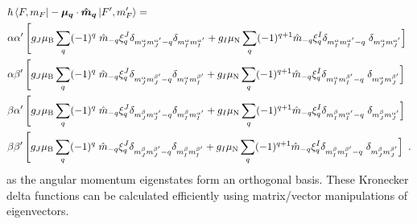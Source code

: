 \documentclass{article}
\begin{document}
\begin{equation}
\begin{split}
       &\hbar\left\langle F, m_F\right|-\boldsymbol{\mu_q}\cdot\boldsymbol{\hat{m}_q}\left|F', m_F'\right\rangle =   \\
       &\alpha \alpha' \left[g_J \mu_{\rm{B}}\sum_q  (-1)^q \right. \hat{m}_{-q} \xi^J_q \delta_{m_J^\alpha m_J^{\alpha'}-q} \delta_{m_I^\alpha m_I^{\alpha'}} + g_I \mu_{\rm{N}}\sum_q (-1)^{q+1}\hat{m}_{-q} \xi^I_q \delta_{m_I^\alpha m_I^{\alpha'}-q} \left. \delta_{m_J^\alpha m_J^{\alpha'}} \right] \\
        &\alpha \beta' \left[g_J \mu_{\rm{B}}\sum_q  (-1)^q \right. \hat{m}_{-q} \xi^J_q \delta_{m_J^\alpha m_J^{\beta'}-q} \delta_{m_I^\alpha m_I^{\beta'}} + g_I \mu_{\rm{N}}\sum_q (-1)^{q+1}\hat{m}_{-q}\xi^I_q\delta_{m_I^\alpha m_I^{\beta'}-q} \left. \delta_{m_J^\alpha m_J^{\beta'}} \right] \\ 
        &\beta \alpha' \left[g_J \mu_{\rm{B}}\sum_q  (-1)^q \right. \hat{m}_{-q} \xi^J_q \delta_{m_J^\beta m_J^{\alpha'}-q} \delta_{m_I^\beta m_I^{\alpha'}} + g_I \mu_{\rm{N}}\sum_q (-1)^{q+1}\hat{m}_{-q}\xi^I_q\delta_{m_I^\beta m_I^{\alpha'}-q} \left. \delta_{m_J^\beta m_J^{\alpha'}} \right] \\
       &\beta \beta' \left[g_J \mu_{\rm{B}}\sum_q  (-1)^q \right. \hat{m}_{-q} \xi^J_q \delta_{m_J^\beta m_J^{\beta'}-q} \delta_{m_I^\beta m_I^{\beta'}} + g_I \mu_{\rm{N}}\sum_q (-1)^{q+1}\hat{m}_{-q}\xi^I_q\delta_{m_I^\beta m_I^{\beta'}-q} \left. \delta_{m_J^\beta m_J^{\beta'}} \right] ~.
\end{split}
\end{equation}
as the angular momentum eigenstates form an orthogonal basis. These Kronecker delta functions can be calculated efficiently using matrix/vector manipulations of eigenvectors.  



\end{document}
